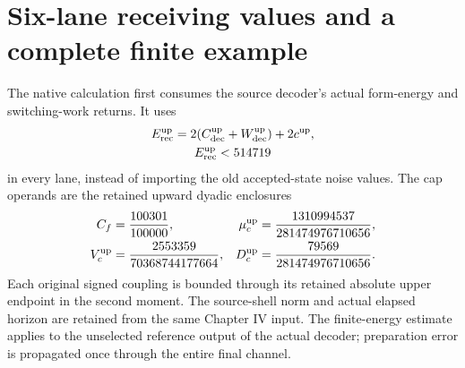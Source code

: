 \section{Six-lane receiving values and a complete finite example}
\label{sec:chvirec-values}

The native calculation first consumes the source decoder's actual
form-energy and switching-work returns. It uses
\begin{equation}
\begin{gathered}
E_{\rm rec}^{\rm up}
 =2(C_{\rm dec}^{\rm up}+W_{\rm dec}^{\rm up})+2c^{\rm up},
 \\
 E_{\rm rec}^{\rm up}<514719
\end{gathered}
\label{eq:chvirec-energy-number}
\end{equation}
in every lane, instead of importing the old accepted-state noise values.
The cap operands are the retained upward dyadic enclosures
\begin{equation}
\begin{aligned}
 C_f&=\frac{100301}{100000},&
 \mu_c^{\rm up}&=\frac{1310994537}{281474976710656},\\
 V_c^{\rm up}&=\frac{2553359}{70368744177664},&
 D_c^{\rm up}&=\frac{79569}{281474976710656}.
\end{aligned}
\label{eq:chvirec-cap-norms}
\end{equation}
Each original signed coupling is bounded through its retained absolute
upper endpoint in the second moment. The source-shell norm and actual
elapsed horizon are retained from the same Chapter IV input.
The finite-energy estimate applies to the unselected reference output
of the actual decoder; preparation error is propagated once through
the entire final channel.

\begin{table}[t]\centering
\small\setlength{\tabcolsep}{5pt}

\caption{Outward six-lane bounds for the declared receiving example.
The tail column charges the pointer's central transition band.
The full ready column also charges source decoding/preparation,
finite memory writing, initialization, hold and the combined aperture/read
allowance. It is uniform over the stated retention interval.}
\label{tab:chvirec-bounds}
\end{table}

